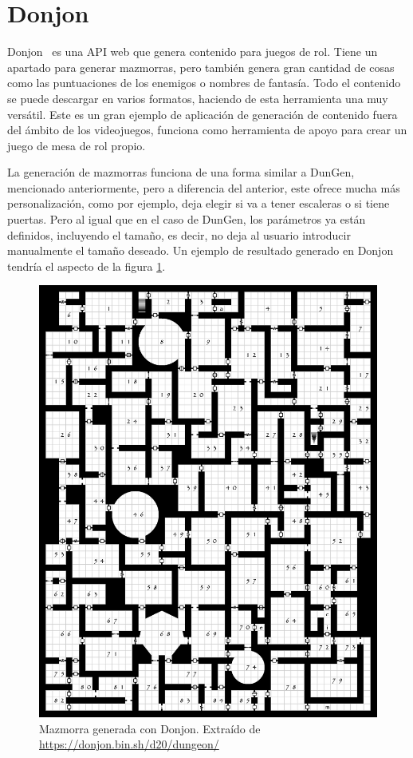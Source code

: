 \section{Donjon}
Donjon~\cite{Donjon} es una API web que genera contenido para juegos de rol. Tiene un apartado para generar mazmorras, pero también genera gran cantidad de cosas como las puntuaciones de los enemigos o nombres de fantasía. Todo el contenido se puede descargar en varios formatos, haciendo de esta herramienta una muy versátil.
Este es un gran ejemplo de aplicación de generación de contenido fuera del ámbito de los videojuegos, funciona como herramienta de apoyo para crear un juego de mesa de rol propio.

La generación de mazmorras funciona de una forma similar a DunGen, mencionado anteriormente, pero a diferencia del anterior, este ofrece mucha más personalización, como por ejemplo, deja elegir si va a tener escaleras o si tiene puertas. Pero al igual que en el caso de DunGen, los parámetros ya están definidos, incluyendo el tamaño, es decir, no deja al usuario introducir manualmente el tamaño deseado.
Un ejemplo de resultado generado en Donjon tendría el aspecto de la figura \ref{fig:LabyrinthDonjon}.
\begin{figure}[h]  
    \centering  
    \includegraphics[width=\textwidth]{img/LabyrinthDonjon.png}  
    \caption{Mazmorra generada con Donjon.  Extraído de \url{https://donjon.bin.sh/d20/dungeon/}}  
    \label{fig:LabyrinthDonjon}
\end{figure}



